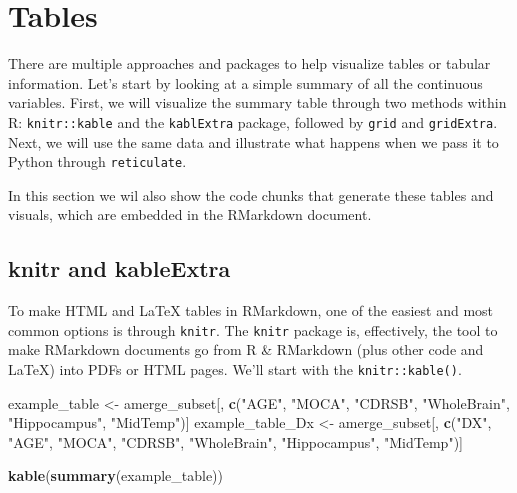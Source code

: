 \documentclass[]{article}
\newenvironment{Shaded}{\begin{snugshade}}{\end{snugshade}}
\newcommand{\KeywordTok}[1]{\textcolor[rgb]{0.13,0.29,0.53}{\textbf{#1}}}
\newcommand{\NormalTok}[1]{#1}
\newcommand{\StringTok}[1]{\textcolor[rgb]{0.31,0.60,0.02}{#1}}
\begin{document}
\hypertarget{tables}{%
\section{Tables}\label{tables}}

There are multiple approaches and packages to help visualize tables or
tabular information. Let's start by looking at a simple summary of all
the continuous variables. First, we will visualize the summary table
through two methods within R: \texttt{knitr::kable} and the
\texttt{kablExtra} package, followed by \texttt{grid} and
\texttt{gridExtra}. Next, we will use the same data and illustrate what
happens when we pass it to Python through \texttt{reticulate}.

In this section we wil also show the code chunks that generate these
tables and visuals, which are embedded in the RMarkdown document.

\hypertarget{knitr-and-kableextra}{%
\subsection{knitr and kableExtra}\label{knitr-and-kableextra}}

To make HTML and LaTeX tables in RMarkdown, one of the easiest and most
common options is through \texttt{knitr}. The \texttt{knitr} package is,
effectively, the tool to make RMarkdown documents go from R \& RMarkdown
(plus other code and LaTeX) into PDFs or HTML pages. We'll start with
the \texttt{knitr::kable()}.

\begin{Shaded}
\begin{Highlighting}[]
\NormalTok{example_table <-}\StringTok{ }\NormalTok{amerge_subset[, }\KeywordTok{c}\NormalTok{(}\StringTok{"AGE"}\NormalTok{, }\StringTok{"MOCA"}\NormalTok{, }\StringTok{"CDRSB"}\NormalTok{, }\StringTok{"WholeBrain"}\NormalTok{, }
    \StringTok{"Hippocampus"}\NormalTok{, }\StringTok{"MidTemp"}\NormalTok{)]}
\NormalTok{example_table_Dx <-}\StringTok{ }\NormalTok{amerge_subset[, }\KeywordTok{c}\NormalTok{(}\StringTok{"DX"}\NormalTok{, }\StringTok{"AGE"}\NormalTok{, }\StringTok{"MOCA"}\NormalTok{, }\StringTok{"CDRSB"}\NormalTok{, }
    \StringTok{"WholeBrain"}\NormalTok{, }\StringTok{"Hippocampus"}\NormalTok{, }\StringTok{"MidTemp"}\NormalTok{)]}
\end{Highlighting}
\end{Shaded}

\begin{Shaded}
\begin{Highlighting}[]
\KeywordTok{kable}\NormalTok{(}\KeywordTok{summary}\NormalTok{(example_table))}
\end{Highlighting}
\end{Shaded}
\end{document}
